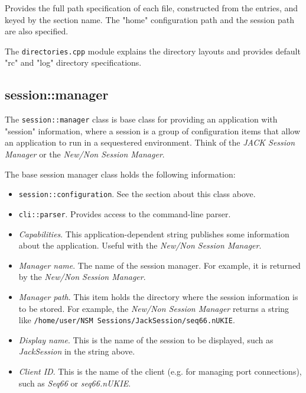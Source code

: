    Provides the full path specification of each file, constructed
   from the entries, and keyed by the section name.
   The "home" configuration path and the session path are also specified.

   The \texttt{directories.cpp} module explains the directory layouts
   and provides default "rc" and "log" directory specifications.

\subsection{session::manager}
\label{subsec:session_namespace_manager}

   The \texttt{session::manager} class is base class for providing an
   application with "session" information, where a session is a group of
   configuration items that allow an application to run in a sequestered
   environment. Think of the \textsl{JACK Session Manager} or the 
   \textsl{New/Non Session Manager}.

   The base session manager class holds the following information:

   \begin{itemize}
      \item \texttt{session::configuration}.
         See the section about this class above.
      \item \texttt{cli::parser}.
         Provides access to the command-line parser.
      \item \textsl{Capabilities}.
         This application-dependent string publishes some information about
         the application. Useful with the
         \textsl{New/Non Session Manager}.
      \item \textsl{Manager name}.
         The name of the session manager. For example, it is returned by the
         \textsl{New/Non Session Manager}.
      \item \textsl{Manager path}.
         This item holds the directory where the session information is to
         be stored.
         For example, the \textsl{New/Non Session Manager} returns a string
         like
         \texttt{/home/user/NSM Sessions/JackSession/seq66.nUKIE}.
      \item \textsl{Display name}.
         This is the name of the session to be displayed, such as
         \textsl{JackSession} in the string above.
      \item \textsl{Client ID}.
         This is the name of the client (e.g. for managing port
         connections), such as \textsl{Seq66} or \textsl{seq66.nUKIE}.
   \end{itemize}

